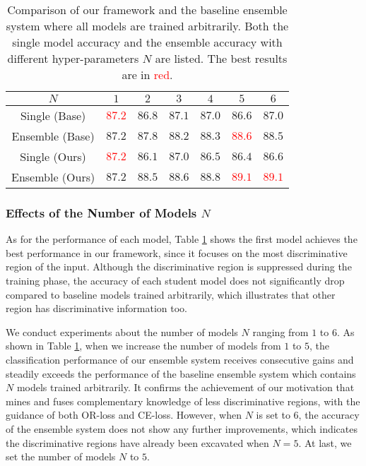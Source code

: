 \documentclass{article}
\begin{document}
\begin{table}[ht]
  \centering
   \caption{
   Comparison of our framework and the baseline ensemble system where all models are trained arbitrarily. Both the single model accuracy and the ensemble accuracy with different hyper-parameters $N$ are listed. The best results are in \textcolor{red}{red}.
   }
  \vspace{+0.3cm}
  \begin{adjustbox}{width=0.9\linewidth,center}
    \begin{tabular}{|c|c|c|c|c|c|c|}
    \hline
$N$ & $1$ & $2$ & $3$ & $4$ & $5$ & $6$ \\
 \hline 
\hline
Single (Base) & \textcolor{red}{$87.2$} & $86.8$ & $87.1$ & $87.0$ & $86.6$ & $87.0$ \\
\hline
Ensemble (Base) & $87.2$ & $87.8$ & $88.2$ & $88.3$ & \textcolor{red}{$88.6$} & $88.5$ \\
 \hline
  \hline
Single (Ours) & \textcolor{red}{$87.2$} & $86.1$ & $87.0$ & $86.5$ & $86.4$ & $86.6$ \\
 \hline
Ensemble (Ours) & $87.2$ & $88.5$ & $88.6$ & $88.8$ & \textcolor{red}{$89.1$} & \textcolor{red}{$89.1$}  \\
\hline
    \end{tabular}\end{adjustbox}
  \label{tab:n}\end{table}

\subsubsection{Effects of the Number of Models $N$}

As for the performance of each model, Table \ref{tab:n} shows the first model achieves the best performance in our framework, since it focuses on the most discriminative region of the input. Although the discriminative region is suppressed during the training phase, the accuracy of each student model does not significantly drop compared to baseline models trained arbitrarily, which illustrates that other region has discriminative information too.  

We conduct experiments about the number of models $N$ ranging from $1$ to $6$. As shown in Table \ref{tab:n}, when we increase the number of models from $1$ to $5$, the classification performance of our ensemble system receives consecutive gains and steadily exceeds the performance of the baseline ensemble system which contains $N$ models trained arbitrarily. It confirms the achievement of our motivation that mines and fuses complementary knowledge of less discriminative regions, with the guidance of both OR-loss and CE-loss. However, when $N$ is set to $6$, the accuracy of the ensemble system does not show any further improvements, which indicates the discriminative regions have already been excavated when $N=5$. At last, we set the number of models $N$ to $5$. 
\end{document}
